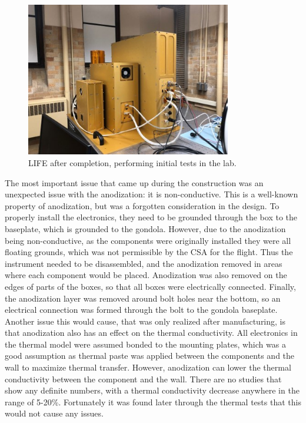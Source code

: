 \begin{figure}
    \centering
    \includegraphics[width=0.8\textwidth]{chap3_images/LIFE_in_lab.jpg}
    \caption{LIFE after completion, performing initial tests in the lab.}
    \label{fig:LIFE_after_build}
\end{figure}

The most important issue that came up during the construction was an unexpected issue with the anodization: it is non-conductive. This is a well-known property of anodization, but was a forgotten consideration in the design. To properly install the electronics, they need to be grounded through the box to the baseplate, which is grounded to the gondola. However, due to the anodization being non-conductive, as the components were originally installed they were all floating grounds, which was not permissible by the CSA for the flight. Thus the instrument needed to be disassembled, and the anodization removed in areas where each component would be placed. Anodization was also removed on the edges of parts of the boxes, so that all boxes were electrically connected. Finally, the anodization layer was removed around bolt holes near the bottom, so an electrical connection was formed through the bolt to the gondola baseplate. Another issue this would cause, that was only realized after manufacturing, is that anodization also has an effect on the thermal conductivity. All electronics in the thermal model were assumed bonded to the mounting plates, which was a good assumption as thermal paste was applied between the components and the wall to maximize thermal transfer. However, anodization can lower the thermal conductivity between the component and the wall. There are no studies that show any definite numbers, with a thermal conductivity decrease anywhere in the range of 5-20\%. Fortunately it was found later through the thermal tests that this would not cause any issues.

